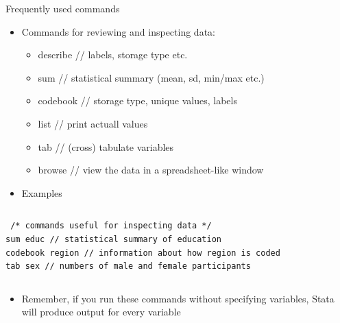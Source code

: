\documentclass[table,smaller]{beamer}
\begin{document}
\begin{frame}[fragile,label=sec-3-1]{Frequently used commands}
 \begin{itemize}
\item Commands for reviewing and inspecting data:
\begin{itemize}
\item describe // labels, storage type etc.
\item sum // statistical summary (mean, sd, min/max etc.)
\item codebook // storage type, unique values, labels
\item list // print actuall values
\item tab // (cross) tabulate variables
\item browse // view the data in a spreadsheet-like window
\end{itemize}

\item Examples
\end{itemize}
\vspace{-.5em} \begin{columns}  \begin{block}{}
\begin{verbatim}
 /* commands useful for inspecting data */
sum educ // statistical summary of education 
codebook region // information about how region is coded
tab sex // numbers of male and female participants
\end{verbatim}
\end{block} \end{columns}

\begin{itemize}
\item Remember, if you run these commands without specifying variables, Stata will produce output for every variable
\end{itemize}
\end{frame}
\end{document}
